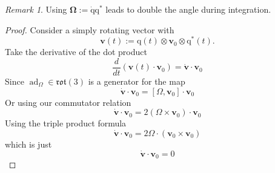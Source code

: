 \documentclass{amsart}
\DeclareMathOperator{\ad}{ad}
\theoremstyle{definition}
\theoremstyle{remark}
\newtheorem{remark}[theorem]{Remark}
\numberwithin{equation}{section}
\begin{document}
\begin{remark}
  Using $\boldsymbol\Omega:=\mathrm{\dot{q}}\mathrm{q}^*$ leads to double the angle during integration.
\end{remark}
\begin{proof}
  Consider a simply rotating vector with
  \begin{equation}
    \mathbf{v}(t) := \mathrm{q}(t) \otimes \mathbf{v}_0 \otimes \mathrm{q}^*(t). \nonumber
  \end{equation}
  Take the derivative of the dot product
  \begin{equation}
    \frac{d}{dt}(\mathbf{v}(t) \cdot \mathbf{v}_0) = \dot{\mathbf{v}} \cdot \mathbf{v}_0
  \end{equation}
  Since $\ad_\Omega \in \mathfrak{rot}(3)$ is a generator for the map
  \begin{equation}
    \dot{\mathbf{v}} \cdot \mathbf{v}_0 = \left[\Omega, \mathbf{v}_0\right] \cdot \mathbf{v}_0 \nonumber
  \end{equation}
  Or using our commutator relation
  \begin{equation}
    \dot{\mathbf{v}} \cdot \mathbf{v}_0 = 2(\Omega \times \mathbf{v}_0) \cdot \mathbf{v}_0 \nonumber
  \end{equation}
  Using the triple product formula
  \begin{equation}
    \dot{\mathbf{v}} \cdot \mathbf{v}_0 = 2\Omega \cdot \left(\mathbf{v}_0 \times \mathbf{v}_0\right) \nonumber
  \end{equation}
  which is just
  \begin{equation}
    \dot{\mathbf{v}} \cdot \mathbf{v}_0 = \mathrm{0} \nonumber
  \end{equation}
\end{proof}

\end{document}
